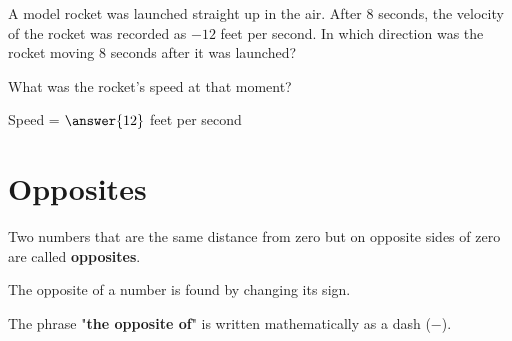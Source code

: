 \documentclass{ximera}[font=12pt]
\begin{document}
\begin{problem}
A model rocket was launched straight up in the air.  After $8$ seconds, the velocity of the rocket was recorded as $-12$ feet per second.
In which direction was the rocket moving $8$ seconds after it was launched?

\begin{multipleChoice}
\end{multipleChoice}

What was the rocket's speed at that moment?

Speed = $\answer{12}$ feet per second

\end{problem}

\section*{Opposites}

\begin{definition}

Two numbers that are the same distance from zero but on opposite sides
of zero are called \textbf{opposites}.

The opposite of a number is found by changing its sign.

The phrase "\textbf{the opposite of}" is written mathematically as a dash ($-$).

\end{definition}
\end{document}
